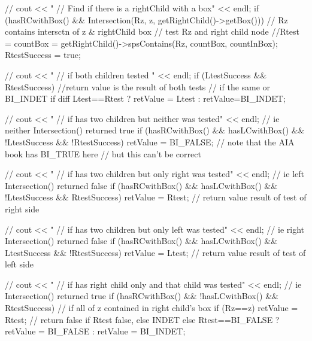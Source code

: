 \begin{DoxyCode}
{{   //    cout << "   // Find if there is a rightChild with a box" << endl;
           if (hasRCwithBox() &&
               Intersection(Rz, z, getRightChild()->getBox())) {
               // Rz contains intersctn of z & rightChild box 
               // test Rz and right child node
               //Rtest = 
               countBox =  getRightChild()->spsContains(Rz, countBox, 
      countInBox);
               RtestSuccess = true;
            }
        
 //          cout << "  // if both children tested " << endl;
           if (LtestSuccess && RtestSuccess) {
               //return value is the result of both tests
               // if the same or BI_INDET if diff
               Ltest==Rtest ?
               retValue = Ltest : retValue=BI_INDET;
            }
          
 //           cout << " // if has two children but neither was tested" << endl;
            // ie neither Intersection() returned true
            if (hasRCwithBox() && hasLCwithBox()
               && !LtestSuccess && !RtestSuccess) {
               retValue = BI_FALSE;
               // note that the AIA book has BI_TRUE here
               // but this can't be correct
            }
  
   //       cout << "  // if has two children but only right was tested" <<
       endl;
             // ie left Intersection() returned false
             if (hasRCwithBox() && hasLCwithBox()
                && !LtestSuccess && RtestSuccess) {
                retValue = Rtest;
                // return value result of test of right side
             }
            
     //   cout << "    // if has two children but only left was tested" <<
       endl;
             // ie right Intersection() returned false
             if (hasRCwithBox() && hasLCwithBox()
                 && LtestSuccess && !RtestSuccess) {
                 retValue = Ltest;
                 // return value result of test of left side
             }
           
 //    cout << "   // if has right child only and that child was tested" <<
       endl;
             // ie Intersection() returned true
             if (hasRCwithBox()
                 && !hasLCwithBox() && RtestSuccess) {
                 // if all of z contained in right child's box
                 if (Rz==z) {
                     retValue = Rtest;
                 }
                 // return false if Rtest false, else INDET
                 else {
                       Rtest==BI_FALSE ? retValue = BI_FALSE
                       : retValue = BI_INDET;
                 }
            }
            
}}
\end{DoxyCode}
